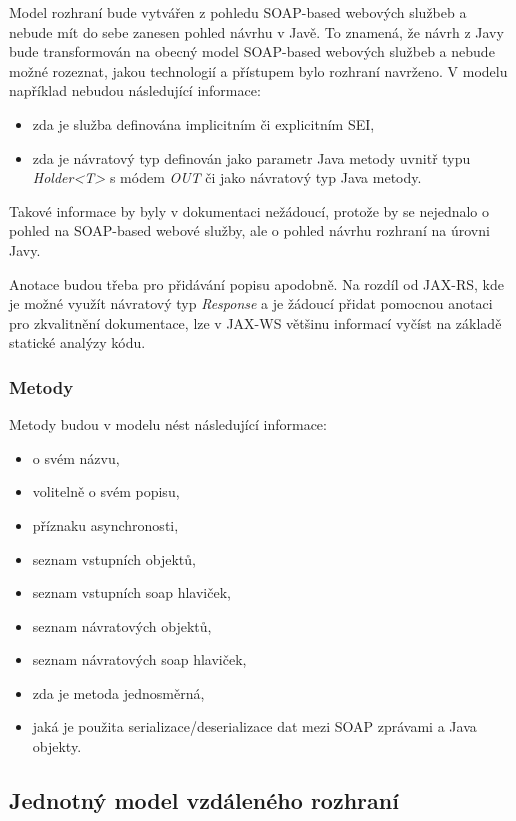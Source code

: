 \documentclass[11pt,twoside,a4paper]{book}
\begin{document}
Model rozhraní bude vytvářen z pohledu SOAP-based
webových službeb a nebude mít do sebe zanesen pohled návrhu v Javě. To
znamená, že návrh z Javy bude transformován na obecný model SOAP-based webových
službeb a nebude možné rozeznat, jakou technologií a přístupem bylo rozhraní
navrženo. V modelu například nebudou následující informace:

\begin{itemize}
  \item zda je služba definována implicitním či explicitním SEI,
  \item zda je návratový typ definován jako parametr Java metody uvnitř typu
  {\em Holder<T>} s módem {\em OUT} či jako návratový typ Java metody.
\end{itemize}

Takové informace by byly v dokumentaci nežádoucí, protože by se nejednalo o
pohled na SOAP-based webové služby, ale o pohled návrhu rozhraní na úrovni Javy.

Anotace budou třeba pro přidávání popisu apodobně. Na rozdíl od JAX-RS, kde je
možné využít návratový typ {\em Response} a je žádoucí přidat pomocnou anotaci
pro zkvalitnění dokumentace, lze v JAX-WS většinu informací vyčíst na základě
statické analýzy kódu.

\subsubsection{Metody}

Metody budou v modelu nést následující informace:

\begin{itemize}
  \item o svém názvu,
  \item volitelně o svém popisu,
  \item příznaku asynchronosti,
  \item seznam vstupních objektů,
  \item seznam vstupních soap hlaviček,
  \item seznam návratových objektů,
  \item seznam návratových soap hlaviček,
  \item zda je metoda jednosměrná,
  \item jaká je použita serializace/deserializace dat mezi SOAP zprávami a Java objekty.
\end{itemize}

\subsection{Jednotný model vzdáleného rozhraní}
\label{subsec:jednotny-model-vzdaleneho-rozhrani}
\end{document}
